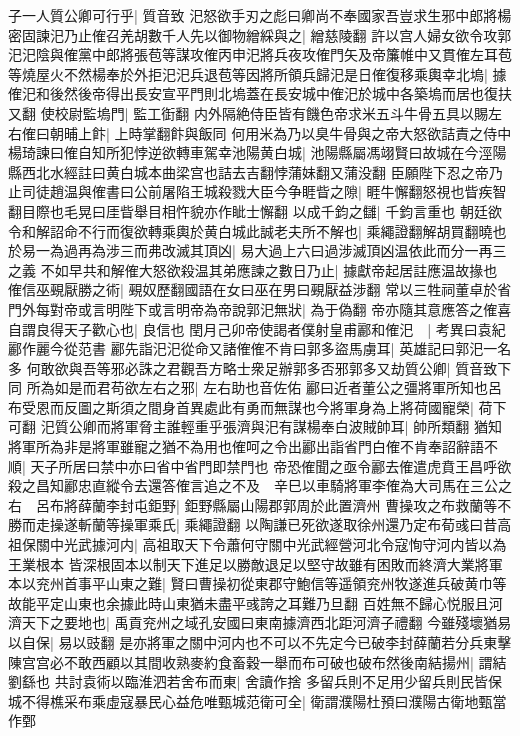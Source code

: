 子一人質公卿可行乎|{
	質音致}
汜怒欲手刃之彪曰卿尚不奉國家吾豈求生邪中郎將楊密固諫汜乃止傕召羌胡數千人先以御物繒綵與之|{
	繒慈陵翻}
許以宫人婦女欲令攻郭汜汜陰與傕黨中郎將張苞等謀攻傕丙申汜將兵夜攻傕門矢及帝簾帷中又貫傕左耳苞等燒屋火不然楊奉於外拒汜汜兵退苞等因將所領兵歸汜是日傕復移乘輿幸北塢|{
	據傕汜和後然後帝得出長安宣平門則北塢蓋在長安城中傕汜於城中各築塢而居也復扶又翻}
使校尉監塢門|{
	監工衘翻}
内外隔絶侍臣皆有饑色帝求米五斗牛骨五具以賜左右傕曰朝晡上飰|{
	上時掌翻飰與飯同}
何用米為乃以臭牛骨與之帝大怒欲詰責之侍中楊琦諫曰傕自知所犯悖逆欲轉車駕幸池陽黄白城|{
	池陽縣屬馮翊賢曰故城在今涇陽縣西北水經註曰黄白城本曲梁宫也詰去吉翻悖蒲妹翻又蒲没翻}
臣願陛下忍之帝乃止司徒趙温與傕書曰公前屠陷王城殺戮大臣今争睚眥之隙|{
	睚牛懈翻怒視也眥疾智翻目際也毛晃曰厓眥舉目相忤貌亦作眦士懈翻}
以成千鈞之讎|{
	千鈞言重也}
朝廷欲令和解詔命不行而復欲轉乘輿於黄白城此誠老夫所不解也|{
	乘繩證翻解胡買翻曉也}
於易一為過再為涉三而弗改滅其頂凶|{
	易大過上六曰過涉滅頂凶温依此而分一再三之義}
不如早共和解傕大怒欲殺温其弟應諫之數日乃止|{
	據獻帝起居註應温故掾也}
傕信巫覡厭勝之術|{
	覡奴歷翻國語在女曰巫在男曰覡厭益涉翻}
常以三牲祠董卓於省門外每對帝或言明陛下或言明帝為帝說郭汜無狀|{
	為于偽翻}
帝亦隨其意應答之傕喜自謂良得天子歡心也|{
	良信也}
閏月己卯帝使謁者僕射皇甫酈和傕汜　|{
	考異曰袁紀酈作麗今從范書}
酈先詣汜汜從命又諸傕傕不肯曰郭多盜馬虜耳|{
	英雄記曰郭汜一名多}
何敢欲與吾等邪必誅之君觀吾方略士衆足辦郭多否邪郭多又劫質公卿|{
	質音致下同}
所為如是而君苟欲左右之邪|{
	左右助也音佐佑}
酈曰近者董公之彊將軍所知也呂布受恩而反圖之斯須之間身首異處此有勇而無謀也今將軍身為上將荷國寵榮|{
	荷下可翻}
汜質公卿而將軍脅主誰輕重乎張濟與汜有謀楊奉白波賊帥耳|{
	帥所類翻}
猶知將軍所為非是將軍雖寵之猶不為用也傕呵之令出酈出詣省門白傕不肯奉詔辭語不順|{
	天子所居曰禁中亦曰省中省門即禁門也}
帝恐傕聞之亟令酈去傕遣虎賁王昌呼欲殺之昌知酈忠直縱令去還答傕言追之不及　辛巳以車騎將軍李傕為大司馬在三公之右　呂布將薛蘭李封屯鉅野|{
	鉅野縣屬山陽郡郭周於此置濟州}
曹操攻之布救蘭等不勝而走操遂斬蘭等操軍乘氏|{
	乘繩證翻}
以陶謙已死欲遂取徐州還乃定布荀彧曰昔高祖保關中光武據河内|{
	高祖取天下令蕭何守關中光武經營河北令寇恂守河内皆以為王業根本}
皆深根固本以制天下進足以勝敵退足以堅守故雖有困敗而終濟大業將軍本以兖州首事平山東之難|{
	賢曰曹操初從東郡守鮑信等遥領兖州牧遂進兵破黄巾等故能平定山東也余據此時山東猶未盡平彧誇之耳難乃旦翻}
百姓無不歸心悦服且河濟天下之要地也|{
	禹貢兖州之域孔安國曰東南據濟西北距河濟子禮翻}
今雖殘壞猶易以自保|{
	易以豉翻}
是亦將軍之關中河内也不可以不先定今已破李封薛蘭若分兵東擊陳宫宫必不敢西顧以其間收熟麥約食畜穀一舉而布可破也破布然後南結揚州|{
	謂結劉繇也}
共討袁術以臨淮泗若舍布而東|{
	舍讀作捨}
多留兵則不足用少留兵則民皆保城不得樵采布乘虛寇暴民心益危唯甄城范衛可全|{
	衛謂濮陽杜預曰濮陽古衛地甄當作鄄}
